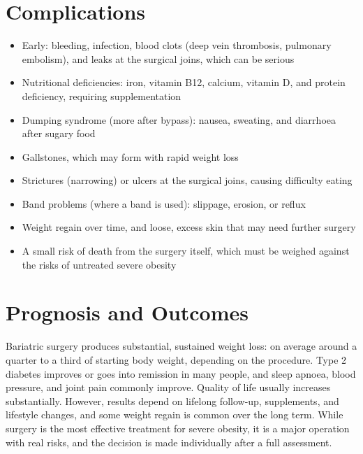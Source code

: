 \section*{Complications}
\begin{itemize}
    \item Early: bleeding, infection, blood clots (deep vein thrombosis, pulmonary embolism), and leaks at the surgical joins, which can be serious
    \item Nutritional deficiencies: iron, vitamin B12, calcium, vitamin D, and protein deficiency, requiring supplementation
    \item Dumping syndrome (more after bypass): nausea, sweating, and diarrhoea after sugary food
    \item Gallstones, which may form with rapid weight loss
    \item Strictures (narrowing) or ulcers at the surgical joins, causing difficulty eating
    \item Band problems (where a band is used): slippage, erosion, or reflux
    \item Weight regain over time, and loose, excess skin that may need further surgery
    \item A small risk of death from the surgery itself, which must be weighed against the risks of untreated severe obesity
\end{itemize}

\section*{Prognosis and Outcomes}
Bariatric surgery produces substantial, sustained weight loss: on average around a quarter to a third of starting body weight, depending on the procedure. Type 2 diabetes improves or goes into remission in many people, and sleep apnoea, blood pressure, and joint pain commonly improve. Quality of life usually increases substantially. However, results depend on lifelong follow-up, supplements, and lifestyle changes, and some weight regain is common over the long term. While surgery is the most effective treatment for severe obesity, it is a major operation with real risks, and the decision is made individually after a full assessment.

